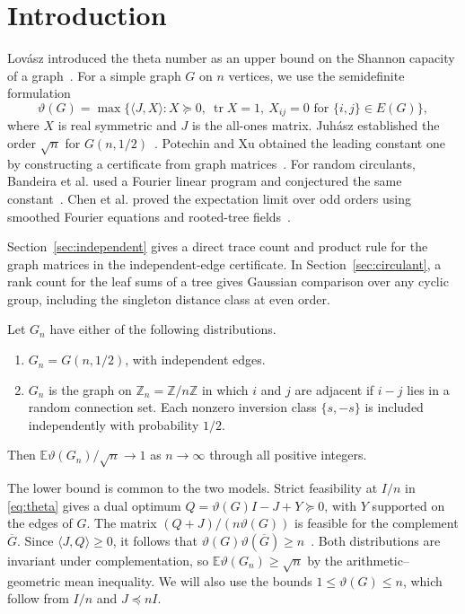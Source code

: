 \documentclass[preprints,article,submit,oneauthor]{Definitions/mdpi}
\newcommand{\E}{\mathbb E}
\newcommand{\Z}{\mathbb Z}
\newcommand{\tr}{\operatorname{tr}}
\begin{document}
\section{Introduction}

Lov\'asz introduced the theta number as an upper bound on the Shannon
capacity of a graph~\cite{Lovasz}. For a simple graph \(G\) on \(n\)
vertices, we use the semidefinite formulation
\begin{equation}\label{eq:theta}
 \vartheta(G)=\max\{\langle J,X\rangle : X\succeq0,\ \tr X=1,\
        X_{ij}=0\text{ for }\{i,j\}\in E(G)\},
\end{equation}
where \(X\) is real symmetric and \(J\) is the all-ones matrix.
Juh\'asz established the order \(\sqrt n\) for \(G(n,1/2)\)~\cite{Juhasz}.
Potechin and Xu obtained the leading constant one by constructing a
certificate from graph matrices~\cite{PX}. For random circulants,
Bandeira et al. used a Fourier linear program and
conjectured the same constant~\cite{BBDFKK}. Chen et al. proved the
expectation limit over odd orders using smoothed Fourier equations and
rooted-tree fields~\cite{CHHWY}.

Section~\ref{sec:independent} gives a direct trace count and product rule
for the graph matrices in the independent-edge certificate. In
Section~\ref{sec:circulant}, a rank count for the leaf sums of a tree gives
Gaussian comparison over any cyclic group, including the singleton
distance class at even order.

\begin{Theorem}\label{thm:main}
Let \(G_n\) have either of the following distributions.
\begin{enumerate}
\item \(G_n=G(n,1/2)\), with independent edges.
\item \(G_n\) is the graph on \(\Z_n=\Z/n\Z\) in which \(i\) and \(j\)
are adjacent if \(i-j\) lies in a random connection set. Each nonzero
inversion class \(\{s,-s\}\) is included independently with probability
\(1/2\).
\end{enumerate}
Then \(\E\vartheta(G_n)/\sqrt n\to 1\) as \(n\to\infty\) through all
positive integers.
\end{Theorem}

The lower bound is common to the two models. Strict feasibility at
\(I/n\) in \eqref{eq:theta} gives a dual optimum
\(Q=\vartheta(G)I-J+Y\succeq0\), with \(Y\) supported on the edges of
\(G\). The matrix \((Q+J)/(n\vartheta(G))\) is feasible for the complement
\(\overline G\). Since \(\langle J,Q\rangle\ge0\), it follows that
\(\vartheta(G)\vartheta(\overline G)\ge n\)~\cite{Lovasz}. Both distributions are
invariant under complementation, so \(\E\vartheta(G_n)\ge\sqrt n\) by
the arithmetic--geometric mean inequality. We will also use the bounds
\(1\le\vartheta(G)\le n\), which follow from \(I/n\) and \(J\preceq nI\).
\end{document}
